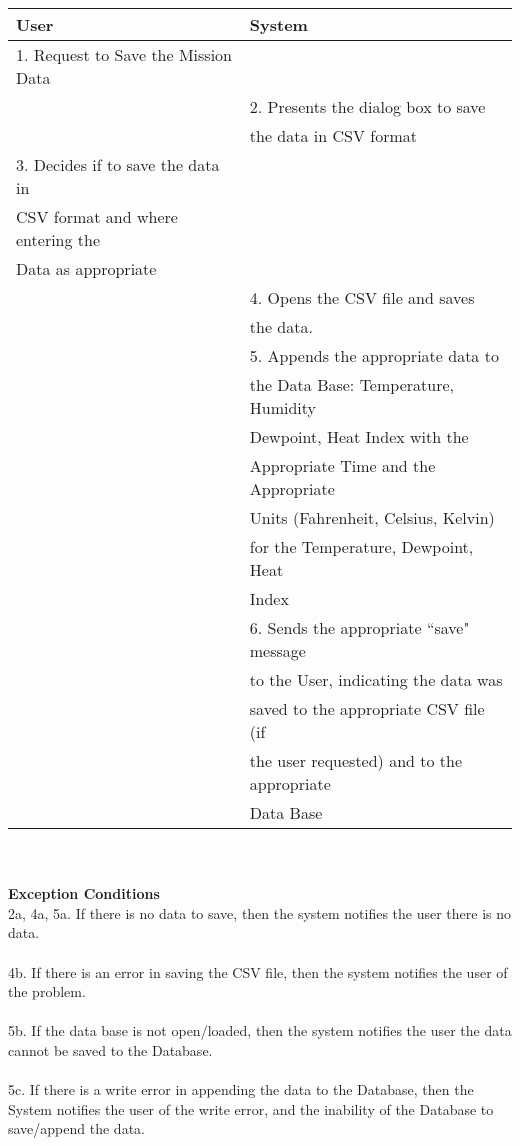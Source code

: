 \documentclass[letterpaper]{article}
\begin{document}
\begin{tabular}{|l|l|}\hline
\textbf{User} & \textbf{System}\\\hline
1.  Request to Save the Mission Data & \\\hline
& 2.  Presents the dialog box to save\\
& the data in CSV format\\\hline
3.  Decides if to save the data in & \\
CSV format and where entering the & \\
Data as appropriate & \\\hline
& 4. Opens the CSV file and saves\\
& the data.\\\hline
& 5.  Appends the appropriate data to\\
& the Data Base:  Temperature, Humidity\\
& Dewpoint, Heat Index with the \\
& Appropriate Time and the Appropriate\\
& Units (Fahrenheit, Celsius, Kelvin)\\
& for the Temperature, Dewpoint, Heat\\
& Index\\\hline
& 6.  Sends the appropriate ``save" message\\
& to the User, indicating the data was\\
& saved to the appropriate CSV file (if\\
& the user requested) and to the appropriate\\
& Data Base\\\hline
\end{tabular}\\\\
\textbf{Exception Conditions}\\
2a, 4a, 5a.  If there is no data to save, then the system notifies the
user there is no data.\\\\
4b.  If there is an error in saving the CSV file, then the system
notifies the user of the problem.\\\\
5b.  If the data base is not open/loaded, then the system notifies the
user the data cannot be saved to the Database.\\\\
5c.  If there is a write error in appending the data to the Database,
then the System notifies the user of the write error, and the
inability of the Database to save/append the data.
\end{document}
